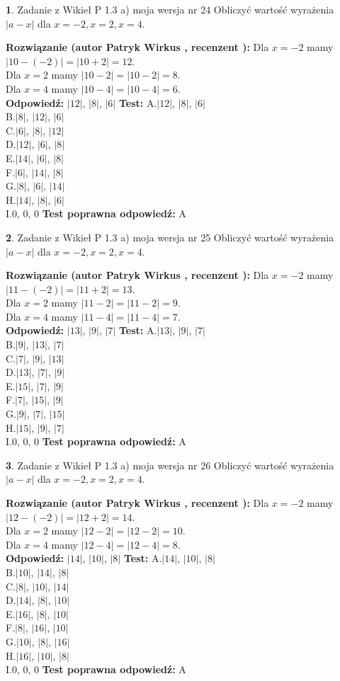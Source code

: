 \documentclass[12pt, a4paper]{article}
\theoremstyle{definition} %
\newtheorem{zad}{}
\newcommand{\zadStart}[1]{\begin{zad}#1\newline}
\newcommand{\zadStop}{\end{zad}}
\newcommand{\rozwStart}[2]{\noindent \textbf{Rozwiązanie (autor #1 , recenzent #2): }\newline}
\newcommand{\rozwStop}{\newline}
\newcommand{\odpStart}{\noindent \textbf{Odpowiedź:}\newline}
\newcommand{\odpStop}{\newline}
\newcommand{\testStart}{\noindent \textbf{Test:}\newline}
\newcommand{\testStop}{\newline}
\newcommand{\kluczStart}{\noindent \textbf{Test poprawna odpowiedź:}\newline}
\newcommand{\kluczStop}{\newline}
\begin{document}
\zadStart{Zadanie z Wikieł P 1.3 a) moja wersja nr 24}
Obliczyć wartość wyrażenia $|a - x|$ dla $x=-2,x=2,x=4$.
\zadStop
\rozwStart{Patryk Wirkus}{}
Dla $x = -2$ mamy $|10 - (-2)| = |10 + 2| = 12$.\\
Dla $x = 2$ mamy $|10 - 2| = |10 - 2| = 8$.\\
Dla $x = 4$ mamy $|10 - 4| = |10 - 4| = 6$.\\
\rozwStop
\odpStart
$|12|$, $|8|$, $|6|$
\odpStop
\testStart
A.$|12|$, $|8|$, $|6|$\\
B.$|8|$, $|12|$, $|6|$\\
C.$|6|$, $|8|$, $|12|$\\
D.$|12|$, $|6|$, $|8|$\\
E.$|14|$, $|6|$, $|8|$\\
F.$|6|$, $|14|$, $|8|$\\
G.$|8|$, $|6|$, $|14|$\\
H.$|14|$, $|8|$, $|6|$\\
I.$0$, $0$, $0$
\testStop
\kluczStart
A
\kluczStop



\zadStart{Zadanie z Wikieł P 1.3 a) moja wersja nr 25}
Obliczyć wartość wyrażenia $|a - x|$ dla $x=-2,x=2,x=4$.
\zadStop
\rozwStart{Patryk Wirkus}{}
Dla $x = -2$ mamy $|11 - (-2)| = |11 + 2| = 13$.\\
Dla $x = 2$ mamy $|11 - 2| = |11 - 2| = 9$.\\
Dla $x = 4$ mamy $|11 - 4| = |11 - 4| = 7$.\\
\rozwStop
\odpStart
$|13|$, $|9|$, $|7|$
\odpStop
\testStart
A.$|13|$, $|9|$, $|7|$\\
B.$|9|$, $|13|$, $|7|$\\
C.$|7|$, $|9|$, $|13|$\\
D.$|13|$, $|7|$, $|9|$\\
E.$|15|$, $|7|$, $|9|$\\
F.$|7|$, $|15|$, $|9|$\\
G.$|9|$, $|7|$, $|15|$\\
H.$|15|$, $|9|$, $|7|$\\
I.$0$, $0$, $0$
\testStop
\kluczStart
A
\kluczStop



\zadStart{Zadanie z Wikieł P 1.3 a) moja wersja nr 26}
Obliczyć wartość wyrażenia $|a - x|$ dla $x=-2,x=2,x=4$.
\zadStop
\rozwStart{Patryk Wirkus}{}
Dla $x = -2$ mamy $|12 - (-2)| = |12 + 2| = 14$.\\
Dla $x = 2$ mamy $|12 - 2| = |12 - 2| = 10$.\\
Dla $x = 4$ mamy $|12 - 4| = |12 - 4| = 8$.\\
\rozwStop
\odpStart
$|14|$, $|10|$, $|8|$
\odpStop
\testStart
A.$|14|$, $|10|$, $|8|$\\
B.$|10|$, $|14|$, $|8|$\\
C.$|8|$, $|10|$, $|14|$\\
D.$|14|$, $|8|$, $|10|$\\
E.$|16|$, $|8|$, $|10|$\\
F.$|8|$, $|16|$, $|10|$\\
G.$|10|$, $|8|$, $|16|$\\
H.$|16|$, $|10|$, $|8|$\\
I.$0$, $0$, $0$
\testStop
\kluczStart
A
\kluczStop
\end{document}
